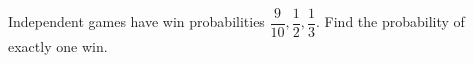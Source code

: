 Independent games have win probabilities $\dfrac{9}{10},\dfrac{1}{2},\dfrac{1}{3}$. Find the probability of exactly one win.
